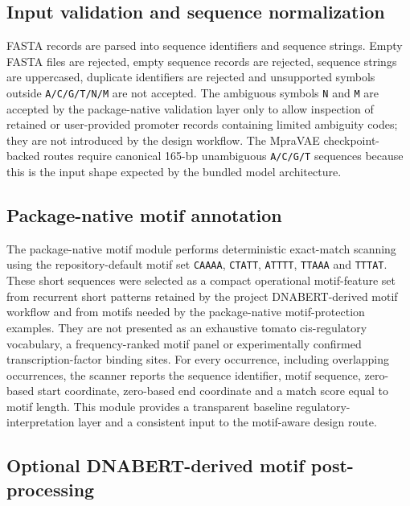 \documentclass[10pt]{article}
\begin{document}
\subsection{Input validation and sequence normalization}

FASTA records are parsed into sequence identifiers and sequence strings. Empty FASTA files are rejected, empty sequence records are rejected, sequence strings are uppercased, duplicate identifiers are rejected and unsupported symbols outside \texttt{A/C/G/T/N/M} are not accepted. The ambiguous symbols \texttt{N} and \texttt{M} are accepted by the package-native validation layer only to allow inspection of retained or user-provided promoter records containing limited ambiguity codes; they are not introduced by the design workflow. The MpraVAE checkpoint-backed routes require canonical 165-bp unambiguous \texttt{A/C/G/T} sequences because this is the input shape expected by the bundled model architecture.

\subsection{Package-native motif annotation}

The package-native motif module performs deterministic exact-match scanning using the repository-default motif set \texttt{CAAAA}, \texttt{CTATT}, \texttt{ATTTT}, \texttt{TTAAA} and \texttt{TTTAT}. These short sequences were selected as a compact operational motif-feature set from recurrent short patterns retained by the project DNABERT-derived motif workflow and from motifs needed by the package-native motif-protection examples. They are not presented as an exhaustive tomato cis-regulatory vocabulary, a frequency-ranked motif panel or experimentally confirmed transcription-factor binding sites. For every occurrence, including overlapping occurrences, the scanner reports the sequence identifier, motif sequence, zero-based start coordinate, zero-based end coordinate and a match score equal to motif length. This module provides a transparent baseline regulatory-interpretation layer and a consistent input to the motif-aware design route.

\subsection{Optional DNABERT-derived motif post-processing}
\end{document}
